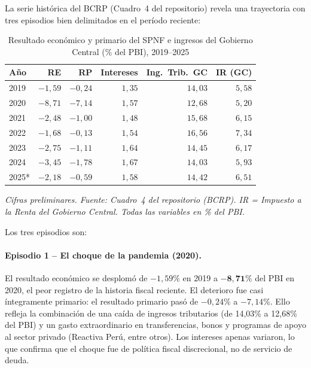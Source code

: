 \documentclass[12pt, a4paper]{article}
\newcommand{\nota}[1]{\textit{\small #1}}
\begin{document}
La serie histórica del BCRP (Cuadro~4 del repositorio) revela una trayectoria
con tres episodios bien delimitados en el período reciente:

\begin{table}[h!]
\centering
\caption{Resultado económico y primario del SPNF e ingresos del Gobierno
         Central (\% del PBI), 2019--2025}
\label{tab:historico}
\setlength{\tabcolsep}{8pt}
\renewcommand{\arraystretch}{1.25}
\begin{tabular}{lrrrrr}
\toprule
\rowcolor{headgray}
\textbf{Año} &
\textbf{RE} &
\textbf{RP} &
\textbf{Intereses} &
\textbf{Ing.\ Trib.\ GC} &
\textbf{IR (GC)} \\
\midrule
2019 & $-1{,}59$ & $-0{,}24$ & $1{,}35$ & $14{,}03$ & $5{,}58$ \\
\rowcolor{rowgray}
2020 & $-8{,}71$ & $-7{,}14$ & $1{,}57$ & $12{,}68$ & $5{,}20$ \\
2021 & $-2{,}48$ & $-1{,}00$ & $1{,}48$ & $15{,}68$ & $6{,}15$ \\
\rowcolor{rowgray}
2022 & $-1{,}68$ & $-0{,}13$ & $1{,}54$ & $16{,}56$ & $7{,}34$ \\
2023 & $-2{,}75$ & $-1{,}11$ & $1{,}64$ & $14{,}45$ & $6{,}17$ \\
\rowcolor{rowgray}
2024 & $-3{,}45$ & $-1{,}78$ & $1{,}67$ & $14{,}03$ & $5{,}93$ \\
2025* & $-2{,}18$ & $-0{,}59$ & $1{,}58$ & $14{,}42$ & $6{,}51$ \\
\bottomrule
\end{tabular}
\smallskip

\nota{* Cifras preliminares.
Fuente: Cuadro~4 del repositorio (BCRP). IR = Impuesto a la Renta del
Gobierno Central. Todas las variables en \% del PBI.}
\end{table}

Los tres episodios son:

\paragraph{Episodio 1 -- El choque de la pandemia (2020).}
El resultado económico se desplomó de $-1{,}59\%$ en 2019 a
$\mathbf{-8{,}71\%}$ del PBI en 2020, el peor registro de la historia
fiscal reciente. El deterioro fue casi íntegramente primario: el resultado
primario pasó de $-0{,}24\%$ a $-7{,}14\%$. Ello refleja la combinación de
una caída de ingresos tributarios (de 14{,}03\% a 12{,}68\% del PBI) y un
gasto extraordinario en transferencias, bonos y programas de apoyo al sector
privado (Reactiva Perú, entre otros). Los intereses apenas variaron, lo que
confirma que el choque fue de política fiscal discrecional, no de servicio
de deuda.
\end{document}

